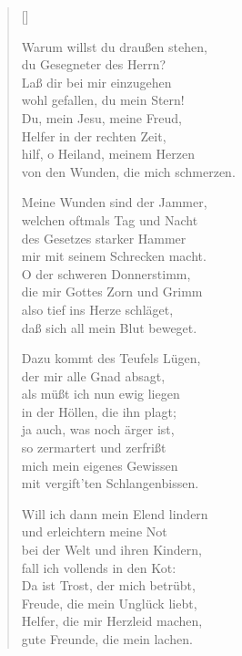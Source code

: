 
\begin{multicols}{2}
\settowidth{\versewidth}{Warum willst du draußen stehen,}                                                  
\begin{verse}[\versewidth]
  
   Warum willst du draußen stehen,\\
  du Gesegneter des Herrn?\\
  Laß dir bei mir einzugehen\\
  wohl gefallen, du mein Stern!\\
  Du, mein Jesu, meine Freud,\\
  Helfer in der rechten Zeit,\\
  hilf, o Heiland, meinem Herzen\\
  von den Wunden, die mich schmerzen.

   Meine Wunden sind der Jammer,\\
  welchen oftmals Tag und Nacht\\
  des Gesetzes starker Hammer\\
  mir mit seinem Schrecken macht.\\
  O der schweren Donnerstimm,\\
  die mir Gottes Zorn und Grimm\\
  also tief ins Herze schläget,\\
  daß sich all mein Blut beweget.

   Dazu kommt des Teufels Lügen,\\
  der mir alle Gnad absagt,\\
  als müßt ich nun ewig liegen\\
  in der Höllen, die ihn plagt;\\
  ja auch, was noch ärger ist,\\
  so zermartert und zerfrißt\\
  mich mein eigenes Gewissen\\
  mit vergift'ten Schlangenbissen.


   Will ich dann mein Elend lindern\\
  und erleichtern meine Not\\
  bei der Welt und ihren Kindern,\\
  fall ich vollends in den Kot:\\
  Da ist Trost, der mich betrübt,\\
  Freude, die mein Unglück liebt,\\
  Helfer, die mir Herzleid machen,\\
  gute Freunde, die mein lachen.


\end{verse}
\end{multicols}
